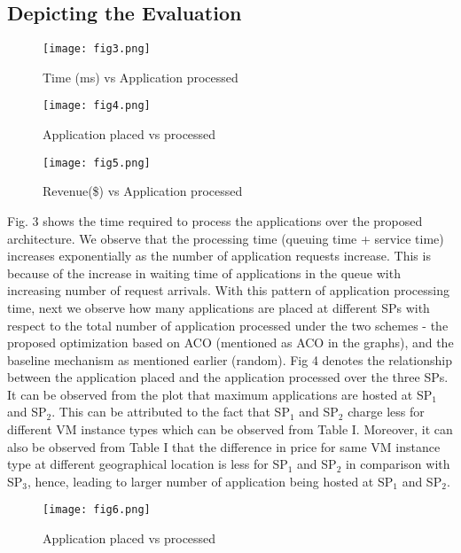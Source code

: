 \documentclass[conference]{IEEEtran}
\newcommand\tab[1][0.8cm]{\hspace*{#1}}
\begin{document}
\subsection{Depicting the Evaluation}
\begin{figure}[htbp]
	\centerline{\texttt{[image: fig3.png]}}
	\caption{Time (ms) vs Application processed}
	\label{fig}
\end{figure}
\begin{figure}[htbp]
	\centerline{\texttt{[image: fig4.png]}}
	\caption{Application placed vs processed}
	\label{fig}
\end{figure}
\begin{figure}[htbp]
	\centerline{\texttt{[image: fig5.png]}}
	\caption{Revenue(\$) vs Application processed}
	\label{fig}
\end{figure}
\tab Fig. 3 shows the time required to process the applications
over the proposed architecture. We observe that the processing
time (queuing time + service time) increases exponentially as
the number of application requests increase. This is because
of the increase in waiting time of applications in the queue
with increasing number of request arrivals. With this pattern
of application processing time, next we observe how many
applications are placed at different SPs with respect to the
total number of application processed under the two schemes
- the proposed optimization based on ACO (mentioned as
ACO in the graphs), and the baseline mechanism as mentioned
earlier (random). Fig 4 denotes the relationship between the
application placed and the application processed over the
three SPs. It can be observed from the plot that maximum
applications are hosted at SP$_1$ and SP$_2$. This can be attributed
to the fact that SP$_1$ and SP$_2$ charge less for different VM
instance types which can be observed from Table I. Moreover,
it can also be observed from Table I that the difference in price
for same VM instance type at different geographical location is
less for SP$_1$ and SP$_2$ in comparison with SP$_3$, hence, leading
to larger number of application being hosted at SP$_1$ and SP$_2$.


\begin{figure}[htbp]
	\centerline{\texttt{[image: fig6.png]}}
	\caption{Application placed vs processed}
	\label{fig}
\end{figure}
\end{document}
